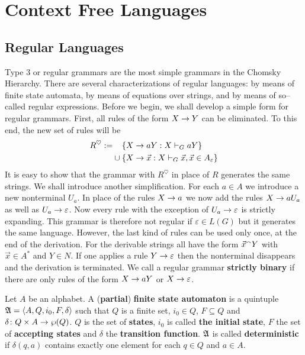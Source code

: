 \chapter{Context Free Languages}
\thispagestyle{empty}
\label{kap2}
%
%
%
\section{Regular Languages}
\label{zweieins}
\label{kap2-1}
%
%
%
Type 3 or regular grammars are the most simple grammars in the
Chomsky Hierarchy.  There are several characterizations of regular
languages: by means of finite state automata, by means of 
equations over strings, and by means of so--called regular expressions.
Before we begin, we shall develop a simple form for regular
grammars. First, all rules of the form $X \rightarrow Y$ can be eliminated.
To this end, the new set of rules will be
\begin{equation}
\begin{split}
R^{\heartsuit} := & \phantom{\mbox{}\cup\mbox{}} \{X \pf a Y :
X \vdash_G a Y\} \\ 
& \cup \{X \pf \vec{x} : X \vdash_G \vec{x}, \vec{x} \in A_{\varepsilon}\}
\end{split}
\end{equation}
It is easy to show that the grammar with $R^{\heartsuit}$ in place
of $R$ generates the same strings. We shall introduce another
simplification.  For each $a \in A$ we introduce a new nonterminal
$U_a$. In place of the rules $X \rightarrow a$ we now add the rules $X \rightarrow a U_a$
as well as $U_a \rightarrow \varepsilon$. Now every rule with the
exception of $U_a \rightarrow \varepsilon$ is strictly expanding.
This grammar is therefore not regular if $\varepsilon \in 
L(G)$ but it generates the same language. However, the last kind 
of rules can be used only once, at the end of the derivation.
For the derivable strings all have the form $\vec{x} {^{\smallfrown}} Y$
with $\vec{x} \in A^{\ast}$ and $Y \in N$. If one applies a
rule $Y \rightarrow \varepsilon$ then the nonterminal disappears
and the derivation is terminated. We call a regular grammar
\textbf{strictly binary}
if there are only rules of the form $X \rightarrow a Y$ or $X \rightarrow \varepsilon$.
\begin{defn}
Let $A$ be an alphabet. A (\textbf{partial}) \textbf{finite state
automaton} is a quintuple $\mathfrak{A} = \langle A, Q, i_0, F, \delta\rangle$
such that $Q$ is a finite set, $i_0 \in Q$, $F \subseteq Q$ and 
$\delta \colon Q \times A \rightarrow \wp(Q)$. $Q$ is the set of \textbf{states}, 
$i_0$ is called \textbf{the initial state}, $F$ the set of 
\textbf{accepting states} and $\delta$ the \textbf{transition function}. 
$\mathfrak{A}$ is called \textbf{deterministic} if $\delta(q,a)$ contains exactly 
one element for each $q \in Q$ and $a \in A$.
\end{defn}
